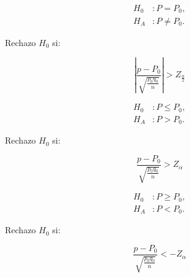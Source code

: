
	\begin{minipage}[c]{\textwidth}
    \begin{minipage}[c]{0.3 \textwidth}\item
    	\begin{align*}
    	H_0&: P = P_0,\\
    	H_A&: P \neq P_0.    	
    	\end{align*}\end{minipage} \hfill
    \begin{minipage}[b]{0.3 \textwidth}\item
				Rechazo	$H_0$ si:		
		\end{minipage} \hfill
    \begin{minipage}[c]{0.3 \textwidth}\item
	 $$\left|\frac { p-P_{ 0 } }{ \sqrt { \frac { p_{ 0 }q_{ 0 } }{ n }  }  } \right| > Z_{\frac{\alpha}{2}}$$
    \end{minipage}
    \end{minipage}
    
    
	\begin{minipage}[c]{\textwidth}
    \begin{minipage}[c]{0.3 \textwidth}\item
    	\begin{align*}
    	H_0&: P \le P_0,\\
    	H_A&: P > P_0.    	
    	\end{align*}\end{minipage} \hfill
    \begin{minipage}[b]{0.3 \textwidth}\item
				Rechazo $H_0$ si:		
		\end{minipage} \hfill
    \begin{minipage}[c]{0.3 \textwidth}\item
	 $$\frac { p-P_{ 0 } }{ \sqrt { \frac { p_{ 0 }q_{ 0 } }{ n }  }  } > Z_{\alpha}$$
    \end{minipage}
    \end{minipage}
    
		\begin{minipage}[b]{\textwidth}
    \begin{minipage}[c]{0.3 \textwidth}\item
    	\begin{align*}
    	H_0&: P \ge P_0,\\
    	H_A&: P < P_0.    	
    	\end{align*}\end{minipage} \hfill
    \begin{minipage}[c]{0.3 \textwidth}\item
				Rechazo $H_0$ si:		
		\end{minipage} \hfill
    \begin{minipage}[c]{0.3 \textwidth}\item
	 $$\frac { p-P_{ 0 } }{ \sqrt { \frac { p_{ 0 }q_{ 0 } }{ n }  }  } <- Z_{\alpha}$$
    \end{minipage}
    \end{minipage} 
